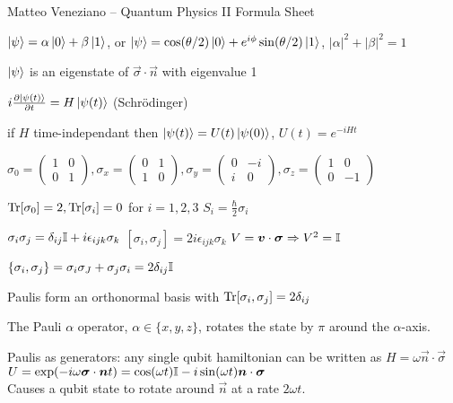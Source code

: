 Matteo Veneziano -- Quantum Physics II Formula Sheet

\begin{squishlist}
    \item $\ket{\psi} = \alpha \ket{0} + \beta \ket{1}$, or $\ket{\psi} = \cos(\theta/2)\ket{0} + e^{i\phi} \sin(\theta/2)\ket{1}$, $|\alpha|^2 + |\beta|^2 = 1$
    \item $\ket{\psi}$ is an eigenstate of $\vec{\sigma}\cdot \vec{n}$ with eigenvalue 1
\end{squishlist}

\begin{squishlist}
    \item $i \D{t}{\ket{\psi(t)}} = H \ket{\psi(t)}$ (Schrödinger)
    \item if $H$ time-independant then $\ket{\psi(t)} = U(t) \ket{\psi(0)}$, $U(t) = e^{-iHt}$
\end{squishlist}

\begin{squishlist}
    \item $\sigma_0 = \begin{pmatrix} 1 & 0\\ 0 & 1 \end{pmatrix},
        \sigma_x = \begin{pmatrix} 0 & 1 \\ 1 & 0 \end{pmatrix}, 
        \sigma_y=\begin{pmatrix} 0 & -i\\ i & 0\end{pmatrix} , 
        \sigma_z = \begin{pmatrix} 1 & 0 \\ 0 & -1\end{pmatrix}$

    \item $\Tr[\sigma_0] = 2, \Tr[\sigma_i] = 0$ for $i=1,2,3$ \hfill $S_i = \frac{\hbar}{2} \sigma_i$
    \item $\sigma_i \sigma_j = \delta_{ij} \id + i \epsilon_{ijk} \sigma_k$ \quad $[\sigma_i, \sigma_j] = 2i \epsilon_{ijk} \sigma_k$ \quad $V = \vec{v}\cdot \vec{\sigma} \Rightarrow V^2 = \id$
    \item $\{\sigma_i, \sigma_j \} = \sigma_i \sigma_J + \sigma_j\sigma_i = 2 \delta_{ij} \id$
    \item Paulis form an orthonormal basis with $\Tr[\sigma_i,\sigma_j] = 2\delta_{ij}$
    \item The Pauli $\alpha$ operator, $\alpha \in \{x,y,z\}$, rotates the state by $\pi$ around the $\alpha$-axis.

    \item Paulis as generators: any single qubit hamiltonian can be written as $H = \omega \vec{n}\cdot \vec{\sigma}$ \\
        $U = \exp(-i\omega \vec{\sigma}\cdot \vec{n} t) = \cos(\omega t) \id - i \sin(\omega t) \vec{n}\cdot\vec{\sigma}$ \\
        Causes a qubit state to rotate around $\vec{n}$ at a rate $2\omega t$.
\end{squishlist}

